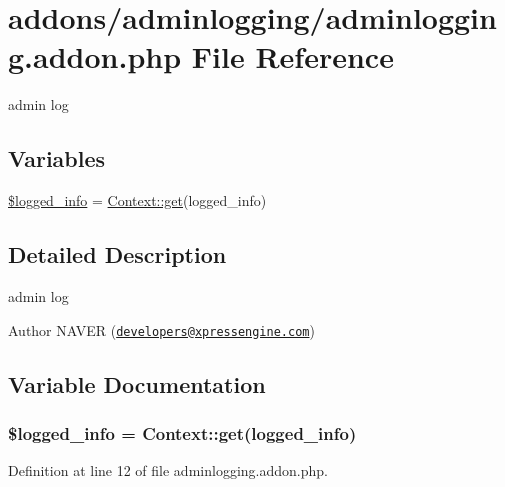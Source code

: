 \hypertarget{adminlogging_8addon_8php}{}\section{addons/adminlogging/adminlogging.addon.\+php File Reference}
\label{adminlogging_8addon_8php}


admin log  


\subsection*{Variables}
\begin{DoxyCompactItemize}
\item 
\hyperlink{adminlogging_8addon_8php_a193c1593ceb216e9fb05b0bad01ebbc8}{\$logged\+\_\+info} = \hyperlink{classContext_a90ce25d65fe6c9778421cbb36ab3def5}{Context\+::get}(\textquotesingle{}logged\+\_\+info\textquotesingle{})
\end{DoxyCompactItemize}


\subsection{Detailed Description}
admin log 

\begin{DoxyAuthor}{Author}
N\+A\+V\+E\+R (\href{mailto:developers@xpressengine.com}{\tt developers@xpressengine.\+com}) 
\end{DoxyAuthor}


\subsection{Variable Documentation}
\hypertarget{adminlogging_8addon_8php_a193c1593ceb216e9fb05b0bad01ebbc8}{}
\subsubsection[{\$logged\+\_\+info}]{\setlength{\rightskip}{0pt plus 5cm}\$logged\+\_\+info = {\bf Context\+::get}(\textquotesingle{}logged\+\_\+info\textquotesingle{})}\label{adminlogging_8addon_8php_a193c1593ceb216e9fb05b0bad01ebbc8}


Definition at line 12 of file adminlogging.\+addon.\+php.

